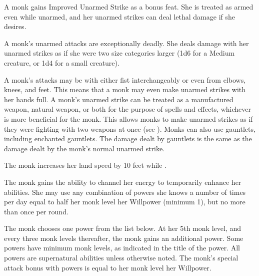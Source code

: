 A monk gains Improved Unarmed Strike as a bonus feat.
She is treated as armed even while unarmed, and her unarmed strikes can deal lethal damage if she desires.

A monk's unarmed attacks are exceptionally deadly.
She deals damage with her unarmed strikes as if she were two size categories larger (1d6 for a Medium creature, or 1d4 for a small creature).

A monk's attacks may be with either fist interchangeably or even from elbows, knees, and feet.
This means that a monk may even make unarmed strikes with her hands full.
A monk's unarmed strike can be treated as a manufactured weapon, natural weapon, or both for the purpose of spells and effects, whichever is more beneficial for the monk.
This allows monks to make unarmed strikes as if they were fighting with two weapons at once (see ).
Monks can also use gauntlets, including enchanted gauntlets.
The damage dealt by gauntlets is the same as the damage dealt by the monk's normal unarmed strike.

The monk increases her land speed by 10 feet while \unencumbered.

The monk gains the ability to channel her \ki energy to temporarily enhance her abilities.
She may use any combination of \ki powers she knows a number of times per day equal to half her monk level \add her Willpower (minimum 1), but no more than once per round.

The monk chooses one \ki power from the list below.
At her 5th monk level, and every three monk levels thereafter, the monk gains an additional \ki power.
Some \ki powers have minimum monk levels, as indicated in the title of the power.
All \ki powers are supernatural abilities unless otherwise noted.
The monk's special attack bonus with \ki powers is equal to her monk level \add her Willpower.

